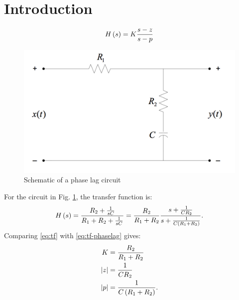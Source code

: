 \section{Introduction}\label{sec:intro}

\begin{equation}\label{eq:tf}
	H \left( s \right) = K { s - z \over s - p }
\end{equation}

\begin{figure}[tbph]
\centering
\includegraphics[width=0.7\linewidth]{graphics/lag-schematic}
\caption{Schematic of a phase lag circuit}
\label{fig:schematic}
\end{figure}
For the circuit in Fig. \ref{fig:schematic}, the transfer function is:
\begin{equation}\label{eq:tf-phaselag}
H \left( s \right) = { R_2 + \frac{1}{sC} \over R_1 + R_2 + \frac{1}{sC}} = {R_2 \over R_1 + R_2 } { s + \frac{1}{C R_2} \over s + \frac{1}{C \left( R_1 + R_2 \right)} }.
\end{equation}
Comparing \eqref{eq:tf} with \eqref{eq:tf-phaselag} gives:
\begin{align*}
K &= {R_2 \over R_1 + R_2 } \\
\left|z\right| &= \frac{1}{C R_2} \\
\left|p\right| &= \frac{1}{C \left( R_1 + R_2 \right)}.
\end{align*}
